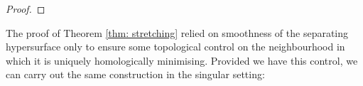 \documentclass[12pt]{article}
\begin{document}
\begin{proof}
\end{proof}
 
The proof of Theorem \ref{thm: stretching} relied on smoothness of the separating hypersurface only to ensure some topological control on the neighbourhood in which it is uniquely homologically minimising. Provided we have this control, we can carry out the same construction in the singular setting: 
\end{document}
